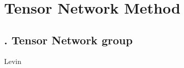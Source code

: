 \chapter{Tensor Network Method}\label{chap:intro_ten}
\section{\thechapter. Tensor Network group}
Levin

